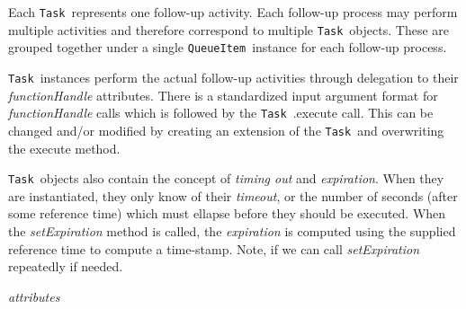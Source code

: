 \documentclass{article}
\newcommand{\QueueItem}{\texttt{QueueItem}~}
\newcommand{\Task}{\texttt{Task}~}
\begin{document}
Each \Task represents one follow-up activity.
Each follow-up process may perform multiple activities and therefore correspond to multiple \Task objects.
These are grouped together under a single \QueueItem instance for each follow-up process.

\Task instances perform the actual follow-up activities through delegation to their \textit{functionHandle} attributes.
There is a standardized input argument format for \textit{functionHandle} calls which is followed by the \Task.execute call.
This can be changed and/or modified by creating an extension of the \Task and overwriting the execute method.

\Task objects also contain the concept of \textit{timing out} and \textit{expiration}.
When they are instantiated, they only know of their \textit{timeout}, or the number of seconds (after some reference time) which must ellapse before they should be executed.
When the \textit{setExpiration} method is called, the \textit{expiration} is computed using the supplied reference time to compute a time-stamp.
Note, if we can call \textit{setExpiration} repeatedly if needed.

\vspace{0.5cm}
\noindent
\textit{attributes}
\end{document}
